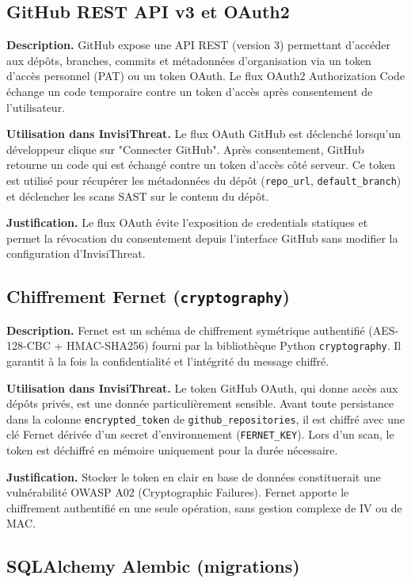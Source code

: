 \subsection{GitHub REST API v3 et OAuth2}

\textbf{Description.} GitHub expose une API REST (version 3) permettant d'accéder aux dépôts, branches, commits et métadonnées d'organisation via un token d'accès personnel (PAT) ou un token OAuth. Le flux OAuth2 Authorization Code échange un code temporaire contre un token d'accès après consentement de l'utilisateur.

\textbf{Utilisation dans InvisiThreat.} Le flux OAuth GitHub est déclenché lorsqu'un développeur clique sur "Connecter GitHub". Après consentement, GitHub retourne un code qui est échangé contre un token d'accès côté serveur. Ce token est utilisé pour récupérer les métadonnées du dépôt (\texttt{repo\_url}, \texttt{default\_branch}) et déclencher les scans SAST sur le contenu du dépôt.

\textbf{Justification.} Le flux OAuth évite l'exposition de credentials statiques et permet la révocation du consentement depuis l'interface GitHub sans modifier la configuration d'InvisiThreat.

\subsection{Chiffrement Fernet (\texttt{cryptography})}

\textbf{Description.} Fernet est un schéma de chiffrement symétrique authentifié (AES-128-CBC + HMAC-SHA256) fourni par la bibliothèque Python \texttt{cryptography}. Il garantit à la fois la confidentialité et l'intégrité du message chiffré.

\textbf{Utilisation dans InvisiThreat.} Le token GitHub OAuth, qui donne accès aux dépôts privés, est une donnée particulièrement sensible. Avant toute persistance dans la colonne \texttt{encrypted\_token} de \texttt{github\_repositories}, il est chiffré avec une clé Fernet dérivée d'un secret d'environnement (\texttt{FERNET\_KEY}). Lors d'un scan, le token est déchiffré en mémoire uniquement pour la durée nécessaire.

\textbf{Justification.} Stocker le token en clair en base de données constituerait une vulnérabilité OWASP A02 (Cryptographic Failures). Fernet apporte le chiffrement authentifié en une seule opération, sans gestion complexe de IV ou de MAC.

\subsection{SQLAlchemy Alembic (migrations)}

